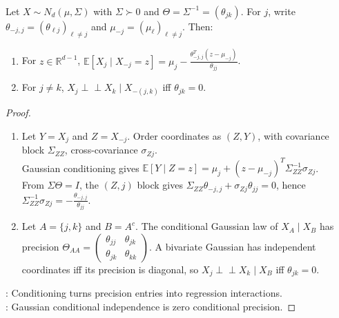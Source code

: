 \begin{proposition} \label{prop:sl-gaussian-graphical-precision-zeros} \\
Let $X\sim N_d(\mu,\Sigma)$ with $\Sigma\succ0$ and $\Theta=\Sigma^{-1}=(\theta_{jk})$. For $j$, write $\theta_{-j,j}=(\theta_{\ell j})_{\ell\neq j}$ and $\mu_{-j}=(\mu_\ell)_{\ell\neq j}$. Then:
\begin{enumerate}[label=(\roman*)]
\setlength{\itemsep}{0pt}
\item For $z\in\mathbb{R}^{d-1}$, $\mathbb{E}[X_j\mid X_{-j}=z]=\mu_j-\frac{\theta_{-j,j}^T(z-\mu_{-j})}{\theta_{jj}}$.
\item For $j\neq k$, $X_j\perp\!\!\!\perp X_k\mid X_{-(j,k)}$ iff $\theta_{jk}=0$.
\end{enumerate}
\begin{proof}
\begin{enumerate}[label=(\roman*)]
\setlength{\itemsep}{0pt}
\item Let $Y=X_j$ and $Z=X_{-j}$. Order coordinates as $(Z,Y)$, with covariance block $\Sigma_{ZZ}$, cross-covariance $\sigma_{Zj}$.\\
Gaussian conditioning gives $\mathbb{E}[Y\mid Z=z]=\mu_j+(z-\mu_{-j})^T\Sigma_{ZZ}^{-1}\sigma_{Zj}$.\\
From $\Sigma\Theta=I$, the $(Z,j)$ block gives $\Sigma_{ZZ}\theta_{-j,j}+\sigma_{Zj}\theta_{jj}=0$, hence $\Sigma_{ZZ}^{-1}\sigma_{Zj}=-\frac{\theta_{-j,j}}{\theta_{jj}}$.
\item Let $A=\{j,k\}$ and $B=A^c$. The conditional Gaussian law of $X_A\mid X_B$ has precision $\Theta_{AA}=\left(\begin{smallmatrix}\theta_{jj}&\theta_{jk}\\ \theta_{jk}&\theta_{kk}\end{smallmatrix}\right)$. A bivariate Gaussian has independent coordinates iff its precision is diagonal, so $X_j\perp\!\!\!\perp X_k\mid X_B$ iff $\theta_{jk}=0$.
\end{enumerate}
: Conditioning turns precision entries into regression interactions.\\
: Gaussian conditional independence is zero conditional precision.
\end{proof}
\end{proposition}


